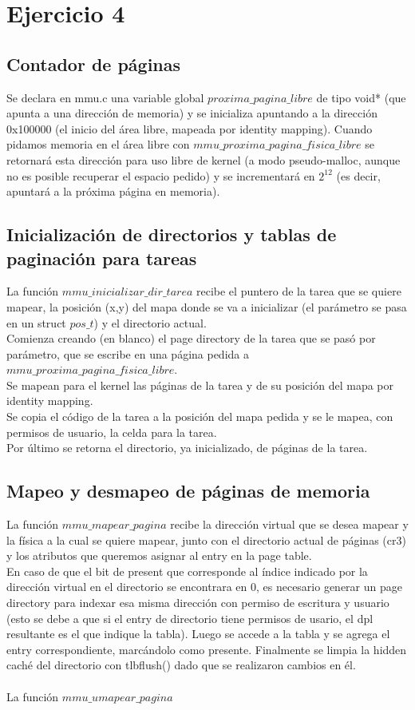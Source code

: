 \section{Ejercicio 4}

\subsection{Contador de páginas}
Se declara en mmu.c una variable global $proxima\_pagina\_libre$ de tipo void* (que apunta a una dirección de memoria) y se inicializa apuntando a la dirección 0x100000 (el inicio del área libre, mapeada por identity mapping). Cuando pidamos memoria en el área libre con $mmu\_proxima\_pagina\_fisica\_libre$ se retornará esta dirección para uso libre de kernel (a modo pseudo-malloc, aunque no es posible recuperar el espacio pedido) y se incrementará en $2^{12}$ (es decir, apuntará a la próxima página en memoria). \\

\subsection{Inicialización de directorios y tablas de paginación para tareas}
La función $mmu\_inicializar\_dir\_tarea$ recibe el puntero de la tarea que se quiere mapear, la posición (x,y) del mapa donde se va a inicializar (el parámetro se pasa en un struct $pos\_t$) y el directorio actual. \\
Comienza creando (en blanco) el page directory de la tarea que se pasó por parámetro, que se escribe en una página pedida a $mmu\_proxima\_pagina\_fisica\_libre$. \\
Se mapean para el kernel las páginas de la tarea y de su posición del mapa por identity mapping.  \\
Se copia el código de la tarea a la posición del mapa pedida y se le mapea, con permisos de usuario, la celda para la tarea. \\
Por último se retorna el directorio, ya inicializado, de páginas de la tarea.

\subsection{Mapeo y desmapeo de páginas de memoria}
La función $mmu\_mapear\_pagina$ recibe la dirección virtual que se desea mapear y la física a la cual se quiere mapear, junto con el directorio actual de páginas (cr3) y los atributos que queremos asignar al entry en la page table. \\
En caso de que el bit de present que corresponde al índice indicado por la dirección virtual en el directorio se encontrara en 0, es necesario generar un page directory para indexar esa misma dirección con permiso de escritura y usuario (esto se debe a que si el entry de directorio tiene permisos de usario, el dpl resultante es el que indique la tabla).
Luego se accede a la tabla y se agrega el entry correspondiente, marcándolo como presente. 
Finalmente se limpia la hidden caché del directorio con tlbflush() dado que se realizaron cambios en él.\\
\\
La función $mmu\_umapear\_pagina$
